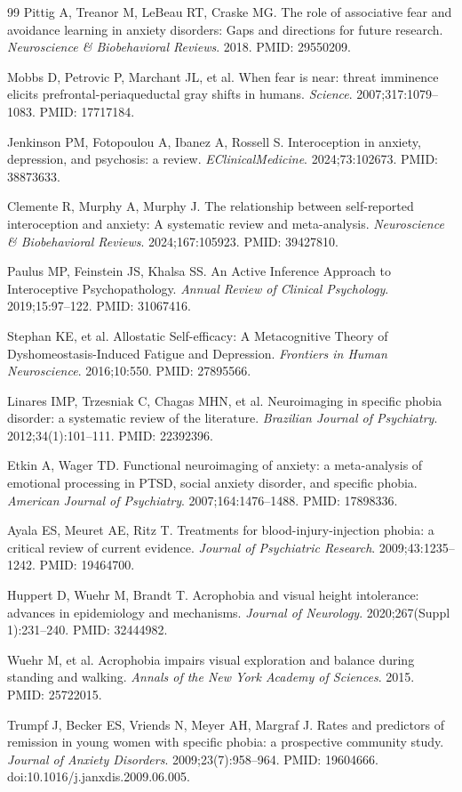 \documentclass[11pt]{article}
\begin{document}
\begin{thebibliography}{99}
Pittig A, Treanor M, LeBeau RT, Craske MG. The role of associative fear and avoidance learning in anxiety disorders: Gaps and directions for future research. \textit{Neuroscience \& Biobehavioral Reviews}. 2018. PMID: 29550209.

Mobbs D, Petrovic P, Marchant JL, et al. When fear is near: threat imminence elicits prefrontal-periaqueductal gray shifts in humans. \textit{Science}. 2007;317:1079--1083. PMID: 17717184.

Jenkinson PM, Fotopoulou A, Ibanez A, Rossell S. Interoception in anxiety, depression, and psychosis: a review. \textit{EClinicalMedicine}. 2024;73:102673. PMID: 38873633.

Clemente R, Murphy A, Murphy J. The relationship between self-reported interoception and anxiety: A systematic review and meta-analysis. \textit{Neuroscience \& Biobehavioral Reviews}. 2024;167:105923. PMID: 39427810.

Paulus MP, Feinstein JS, Khalsa SS. An Active Inference Approach to Interoceptive Psychopathology. \textit{Annual Review of Clinical Psychology}. 2019;15:97--122. PMID: 31067416.

Stephan KE, et al. Allostatic Self-efficacy: A Metacognitive Theory of Dyshomeostasis-Induced Fatigue and Depression. \textit{Frontiers in Human Neuroscience}. 2016;10:550. PMID: 27895566.

Linares IMP, Trzesniak C, Chagas MHN, et al. Neuroimaging in specific phobia disorder: a systematic review of the literature. \textit{Brazilian Journal of Psychiatry}. 2012;34(1):101--111. PMID: 22392396.

Etkin A, Wager TD. Functional neuroimaging of anxiety: a meta-analysis of emotional processing in PTSD, social anxiety disorder, and specific phobia. \textit{American Journal of Psychiatry}. 2007;164:1476--1488. PMID: 17898336.

Ayala ES, Meuret AE, Ritz T. Treatments for blood-injury-injection phobia: a critical review of current evidence. \textit{Journal of Psychiatric Research}. 2009;43:1235--1242. PMID: 19464700.

Huppert D, Wuehr M, Brandt T. Acrophobia and visual height intolerance: advances in epidemiology and mechanisms. \textit{Journal of Neurology}. 2020;267(Suppl 1):231--240. PMID: 32444982.

Wuehr M, et al. Acrophobia impairs visual exploration and balance during standing and walking. \textit{Annals of the New York Academy of Sciences}. 2015. PMID: 25722015.

Trumpf J, Becker ES, Vriends N, Meyer AH, Margraf J. Rates and predictors of remission in young women with specific phobia: a prospective community study. \textit{Journal of Anxiety Disorders}. 2009;23(7):958--964. PMID: 19604666. doi:10.1016/j.janxdis.2009.06.005.

\end{thebibliography}
\end{document}
